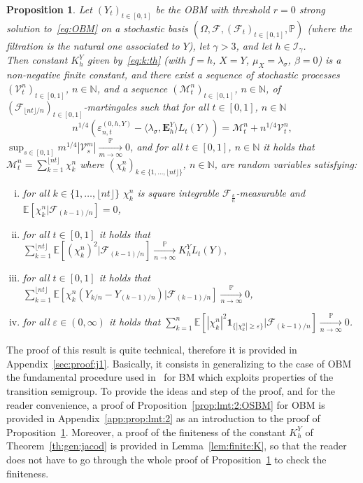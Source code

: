 \documentclass[12pt]{article}
\numberwithin{equation}{section}
\newtheorem{proposition}{Proposition}
\theoremstyle{definition}
\theoremstyle{remark}
\newcommand{\convp}[1][]{\xrightarrow[#1]{\PP}}
\newcommand{\NN}{\mathbb{N}}
\newcommand{\PP}{\mathbb{P}}
\newcommand{\EE}{\mathbb{E}}
\newcommand{\cF}{\mathcal{F}}
\newcommand{\ind}[1]{\mathbf{1}_{#1}}
\newcommand{\Lg}[1]{\mathcal{I}_{#1}}
\newcommand{\bfH}[1]{\mathbf{E}^Y_{#1}}
\begin{document}
%
\begin{proposition} \label{th:j2:2}
Let $(Y_t)_{t\in [0,1]}$ be the OBM with threshold $r=0$ strong solution to~\eqref{eq:OBM} on a stochastic basis $(\Omega, \cF, (\cF_t)_{t\in [0,1]},\PP)$ (where the filtration is the natural one associated to $Y$), let $\gamma >3$, and let $h\in \Lg{\gamma}$.
\\
Then constant $K_h^Y$ given by~\eqref{eq:k:th} (with $f=h$, $X=Y$, $\mu_X=\lambda_\sigma$, $\beta=0$) is a non-negative finite constant, 
and there exist a sequence of stochastic processes 
$(\mathcal{V}^n_t)_{t\in [0,1]}$, $n\in \NN$,
and a sequence $(\mathcal{M}^n_t)_{t\in [0,1]}$, $n\in \NN$, of $(\mathcal{F}_{{\lfloor n t \rfloor}/{n}})_{t\in [0,1]}$-martingales
such that for all $t\in [0,1]$, $n\in \NN$
\begin{equation} \label{eq:decomposition}
	n^{1/4}\left( \varepsilon_{n,t}^{(0,h,Y)} - \langle \lambda_\sigma , \bfH h \rangle L_t(Y)\right)
	=		 
	\mathcal{M}^n_t + n^{1/4} \mathcal{V}^n_t,
\end{equation}
$
	\sup_{s\in [0,1]} m^{1/4} |\mathcal{V}^m_s| \convp[m\to\infty] 0
$, 
and for all $t\in [0,1]$, $n\in \NN$ it holds that
$
	\mathcal{M}^n_t =  \sum_{k=1}^{\lfloor n t \rfloor} \chi^n_k
$
where $(\chi^n_k)_{k\in \{1, \ldots, \lfloor n t \rfloor\}}$, $n\in \NN$,
are random variables satisfying:
\begin{enumerate}[i)]
\item \label{th:j2:item1:2}
	for all $k\in \{1, \ldots, \lfloor n t \rfloor\}$
$\chi^n_k$ is square integrable $\mathcal{F}_{\frac{k}{n}}$-measurable
and
$
	\EE\!\left[ \chi_k^n | \cF_{(k-1)/n}\right] = 0$,
\item \label{th:j2:item2:2}
for all $t\in [0,1]$ it holds that
$
	\sum_{k=1}^{\lfloor n t \rfloor} \EE\!\left[ (\chi_k^n)^2 | \cF_{(k-1)/n}\right] \convp[n\to\infty] K_h^Y L_t(Y),
$
\item \label{th:j2:item3:2}
for all $t\in [0,1]$ it holds that
$
	\sum_{k=1}^{\lfloor n t \rfloor} \EE\!\left[ \chi_k^n (Y_{k/n}-Y_{{(k-1)}/n})| \cF_{(k-1)/n}\right] \convp[n\to\infty] 0
$,
\item \label{th:j2:item4:2}
for all $\varepsilon \in (0,\infty)$ it holds that
$
	 \sum_{k=1}^{n} \EE\!\left[ |\chi_k^n|^2 \ind{\{|\chi_k^n|\geq  \varepsilon \}}| \cF_{(k-1)/n}\right] \convp[n\to\infty] 0
$.
\end{enumerate}
\end{proposition}
\noindent The proof of this result is quite technical, therefore it is provided in Appendix~\ref{sec:proof:j1}. 
Basically, it consists in generalizing to the case of OBM the fundamental procedure used in~\cite{j1} for BM which exploits properties of the transition semigroup.  
To provide the ideas and step of the proof, and for the reader convenience, a proof of Proposition~\ref{prop:lmt:2:OSBM} for OBM is provided in Appendix~\ref{app:prop:lmt:2} as an introduction to the proof of Proposition~\ref{th:j2:2}.
Moreover, a proof of the finiteness of the constant $K_h^Y$ of Theorem~\ref{th:gen:jacod} is provided in Lemma~\ref{lem:finite:K}, so that the reader does not have to go through the whole proof of Proposition~\ref{th:j2:2} to check the finiteness.
 
\end{document}
